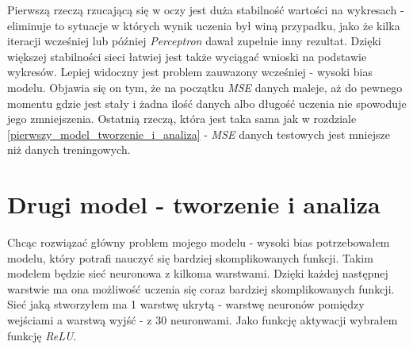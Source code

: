 \documentclass[12pt]{aghdpl}
\begin{document}
		Pierwszą rzeczą rzucającą się w oczy jest duża stabilność wartości na wykresach - eliminuje to sytuacje w których wynik uczenia był winą przypadku, jako że kilka iteracji wcześniej lub później \textit{Perceptron} dawał zupełnie inny rezultat. Dzięki większej stabilności sieci łatwiej jest także wyciągać wnioski na podstawie wykresów. Lepiej widoczny jest problem zauwazony wcześniej - wysoki bias modelu. Objawia się on tym, że na początku \textit{MSE} danych maleje, aż do pewnego momentu gdzie jest stały i żadna ilość danych albo długość uczenia nie spowoduje jego zmniejszenia. Ostatnią rzeczą, która jest taka sama jak w rozdziale \ref{pierwszy_model_tworzenie_i_analiza} - \textit{MSE} danych testowych jest mniejsze niż danych treningowych.
		
		\section{Drugi model - tworzenie i analiza}
		Chcąc rozwiązać główny problem mojego modelu - wysoki bias potrzebowałem modelu, który potrafi nauczyć się bardziej skomplikowanych funkcji. Takim modelem będzie sieć neuronowa z kilkoma warstwami. Dzięki każdej następnej warstwie ma ona możliwość uczenia się coraz bardziej skomplikowanych funkcji. Sieć jaką stworzyłem ma 1 warstwę ukrytą - warstwę neuronów pomiędzy wejściami a warstwą wyjść - z 30 neuronwami. Jako funkcję aktywacji wybrałem funkcję \textit{ReLU}.
		
		\printbibliography
\end{document}
